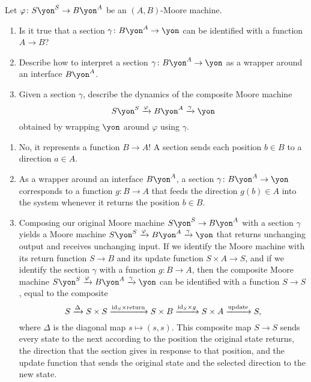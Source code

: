 \documentclass[Book-Poly]{subfiles}
\begin{document}
\begin{exercise} \label{exc.enclosures_as_functions}
Let $\varphi\colon S\yon^S\to B\yon^A$ be an $(A,B)$-Moore machine.
\begin{enumerate}
	\item Is it true that a section $\gamma\colon B\yon^A\to\yon$ can be identified with a function $A\to B$?
	\item Describe how to interpret a section $\gamma\colon B\yon^A\to\yon$ as a wrapper around an interface $B\yon^A$.
	\item Given a section $\gamma$, describe the dynamics of the composite Moore machine \[S\yon^S\To{\varphi}B\yon^A\To{\gamma}\yon\] obtained by wrapping $\yon$ around $\varphi$ using $\gamma$.
\qedhere
\end{enumerate}
\begin{solution}
\begin{enumerate}
	\item No, it represents a function $B\to A$!
	A section sends each position $b\in B$ to a direction $a\in A$.
	\item As a wrapper around an interface $B\yon^A$, a section $\gamma\colon B\yon^A\to\yon$ corresponds to a function $g\colon B\to A$ that feeds the direction $g(b)\in A$ into the system whenever it returns the position $b\in B$.
	\item Composing our original Moore machine $S\yon^S\to B\yon^A$ with a section $\gamma$ yields a Moore machine $S\yon^S\To{\varphi}B\yon^A\To{\gamma}\yon$ that returns unchanging output and receives unchanging input.
	If we identify the Moore machine with its return function $S\to B$ and its update function $S\times A\to S$, and if we identify the section $\gamma$ with a function $g\colon B\to A$, then the composite Moore machine $S\yon^S\To{\varphi}B\yon^A\To{\gamma}\yon$ can be identified with a function $S\to S$, equal to the composite
	\[
	    S\xrightarrow{\Delta}S\times S\xrightarrow{\mathrm{id}_S\times\text{return}}S\times B\xrightarrow{\mathrm{id}_S\times g}S\times A\xrightarrow{\text{update}}S,
	\]
	where $\Delta$ is the diagonal map $s\mapsto(s,s)$.
	This composite map $S\to S$ sends every state to the next according to the position the original state returns, the direction that the section gives in response to that position, and the update function that sends the original state and the selected direction to the new state.
\end{enumerate}
\end{solution}
\end{exercise}
\end{document}
